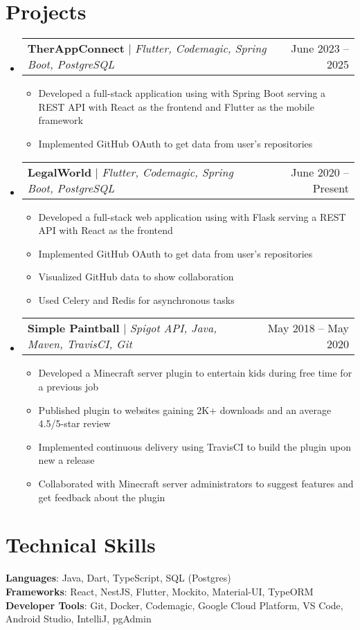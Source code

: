\documentclass[letterpaper,11pt]{article}
\makeatletter
\newcommand{\resumeItem}[1]{
  \item\small{
    {#1 \vspace{-2pt}}
  }
}
\newcommand{\resumeProjectHeading}[2]{
    \item
    \begin{tabular*}{0.97\textwidth}{l@{\extracolsep{\fill}}r}
      \small#1 & #2 \\
    \end{tabular*}\vspace{-7pt}
}
\newcommand{\resumeSubHeadingListStart}{\begin{itemize}[leftmargin=0.15in, label={}]}
\newcommand{\resumeSubHeadingListEnd}{\end{itemize}}
\newcommand{\resumeItemListStart}{\begin{itemize}}
\newcommand{\resumeItemListEnd}{\end{itemize}\vspace{-5pt}}
\makeatother
\begin{document}
\section{Projects}
    \resumeSubHeadingListStart
      \resumeProjectHeading
          {\textbf{TherAppConnect} $|$ \emph{Flutter, Codemagic, Spring Boot, PostgreSQL}}{June 2023 -- 2025}
          \resumeItemListStart
            \resumeItem{Developed a full-stack application using with Spring Boot serving a REST API with React as the frontend and Flutter as the mobile framework}
            \resumeItem{Implemented GitHub OAuth to get data from user’s repositories}
          \resumeItemListEnd
      \resumeProjectHeading
          {\textbf{LegalWorld} $|$ \emph{Flutter, Codemagic, Spring Boot, PostgreSQL}}{June 2020 -- Present}
          \resumeItemListStart
            \resumeItem{Developed a full-stack web application using with Flask serving a REST API with React as the frontend}
            \resumeItem{Implemented GitHub OAuth to get data from user’s repositories}
            \resumeItem{Visualized GitHub data to show collaboration}
            \resumeItem{Used Celery and Redis for asynchronous tasks}
          \resumeItemListEnd
      \resumeProjectHeading
          {\textbf{Simple Paintball} $|$ \emph{Spigot API, Java, Maven, TravisCI, Git}}{May 2018 -- May 2020}
          \resumeItemListStart
            \resumeItem{Developed a Minecraft server plugin to entertain kids during free time for a previous job}
            \resumeItem{Published plugin to websites gaining 2K+ downloads and an average 4.5/5-star review}
            \resumeItem{Implemented continuous delivery using TravisCI to build the plugin upon new a release}
            \resumeItem{Collaborated with Minecraft server administrators to suggest features and get feedback about the plugin}
          \resumeItemListEnd
    \resumeSubHeadingListEnd



%
\section{Technical Skills}
 \begin{itemize}[leftmargin=0.15in, label={}]
    \small{\item{
     \textbf{Languages}{: Java, Dart, TypeScript, SQL (Postgres)} \\
     \textbf{Frameworks}{: React, NestJS, Flutter, Mockito, Material-UI, TypeORM} \\
     \textbf{Developer Tools}{: Git, Docker, Codemagic, Google Cloud Platform, VS Code, Android Studio, IntelliJ, pgAdmin} \\
    }}
 \end{itemize}


\end{document}
